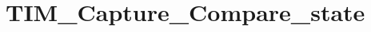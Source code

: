 \hypertarget{group___t_i_m___capture___compare__state}{\section{T\-I\-M\-\_\-\-Capture\-\_\-\-Compare\-\_\-state}
\label{group___t_i_m___capture___compare__state}
}
